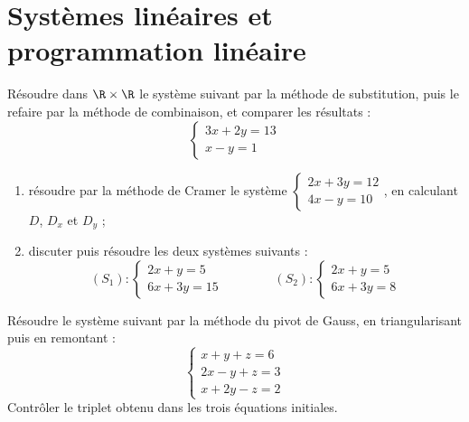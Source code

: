 \clearpage
\chapter{Systèmes linéaires et programmation linéaire}

\begin{exercice}
Résoudre dans $\R \times \R$ le système suivant par la méthode de substitution, puis le refaire par la méthode de combinaison, et comparer les résultats :
\[
\begin{cases}
3x + 2y = 13\\
x - y = 1
\end{cases}
\]
\end{exercice}

\begin{exercice}
\begin{enumerate}
\item résoudre par la méthode de Cramer le système $\begin{cases}2x + 3y = 12\\ 4x - y = 10\end{cases}$, en calculant $D$, $D_{x}$ et $D_{y}$ ;
\item discuter puis résoudre les deux systèmes suivants :
\[
(S_{1}) : \begin{cases}2x + y = 5\\ 6x + 3y = 15\end{cases}
\qquad\qquad
(S_{2}) : \begin{cases}2x + y = 5\\ 6x + 3y = 8\end{cases}
\]
\end{enumerate}
\end{exercice}

\begin{exercice}
Résoudre le système suivant par la méthode du pivot de Gauss, en triangularisant puis en remontant :
\[
\begin{cases}
x + y + z = 6\\
2x - y + z = 3\\
x + 2y - z = 2
\end{cases}
\]
Contrôler le triplet obtenu dans les trois équations initiales.
\end{exercice}

